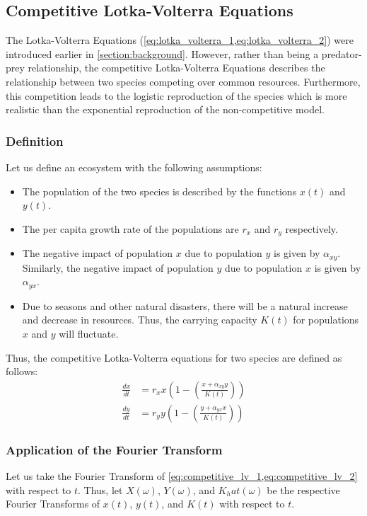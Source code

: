\subsection{Competitive Lotka-Volterra Equations}
The Lotka-Volterra Equations (\cref{eq:lotka_volterra_1,eq:lotka_volterra_2}) were introduced earlier in \cref{section:background}. However, rather than being a predator-prey relationship, the competitive Lotka-Volterra Equations describes the relationship between two species competing over common resources. Furthermore, this competition leads to the logistic reproduction of the species which is more realistic than the exponential reproduction of the non-competitive model.

\subsubsection{Definition}
\noindent
Let us define an ecosystem with the following assumptions:
\begin{itemize}
    \item The population of the two species is described by the functions \(x(t)\) and \(y(t)\).
    \item The per capita growth rate of the populations are \(r_x\) and \(r_y\) respectively.
    \item The negative impact of population \(x\) due to population \(y\) is given by \(\alpha_{xy}\). Similarly, the negative impact of population \(y\) due to population \(x\) is given by \(\alpha_{yx}\).
    \item Due to seasons and other natural disasters, there will be a natural increase and decrease in resources. Thus, the carrying capacity \(K(t)\) for populations \(x\) and \(y\) will fluctuate.
\end{itemize}

\noindent
Thus, the competitive Lotka-Volterra equations for two species are defined as follows:
\begin{align}  
    \frac{dx}{dt} &= r_x x \left(1 - \left(\frac{x + \alpha_{xy} y}{K(t)}\right)\right) \label{eq:competitive_lv_1} \\ 
    \frac{dy}{dt} &= r_y y \left(1 - \left(\frac{y + \alpha_{yx} x}{K(t)}\right)\right) \label{eq:competitive_lv_2}
\end{align}

\subsubsection{Application of the Fourier Transform}
Let us take the Fourier Transform of \cref{eq:competitive_lv_1,eq:competitive_lv_2} with respect to \(t\). Thus, let \(X(\omega)\), \(Y(\omega)\), and \(K_hat(\omega)\) be the respective Fourier Transforms of \(x(t)\), \(y(t)\), and \(K(t)\) with respect to \(t\).

